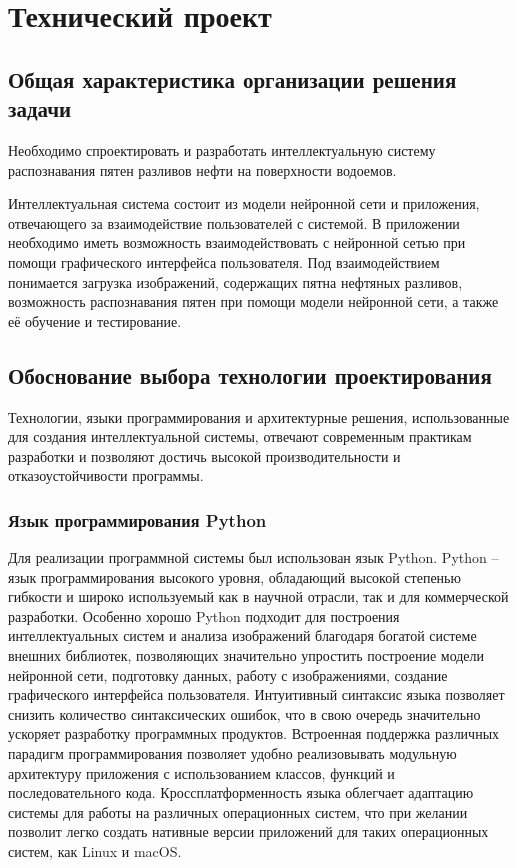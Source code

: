 \section{Технический проект}
\subsection{Общая характеристика организации решения задачи}

Необходимо спроектировать и разработать интеллектуальную систему распознавания пятен разливов нефти на поверхности водоемов.

Интеллектуальная система состоит из модели нейронной сети и приложения, отвечающего за взаимодействие пользователей с системой. В приложении необходимо иметь возможность взаимодействовать с нейронной сетью при помощи графического интерфейса пользователя. Под взаимодействием понимается загрузка изображений, содержащих пятна нефтяных разливов, возможность распознавания пятен при помощи модели нейронной сети, а также её обучение и тестирование.

\subsection{Обоснование выбора технологии проектирования}

Технологии, языки программирования и архитектурные решения, использованные для создания интеллектуальной системы, отвечают современным практикам разработки и позволяют достичь высокой производительности и отказоустойчивости программы.

\subsubsection{Язык программирования Python}

Для реализации программной системы был использован язык Python. Python -- язык программирования высокого уровня, обладающий высокой степенью гибкости и широко используемый как в научной отрасли, так и для коммерческой разработки. Особенно хорошо Python подходит для построения интеллектуальных систем и анализа изображений благодаря богатой системе внешних библиотек, позволяющих значительно упростить построение модели нейронной сети, подготовку данных, работу с изображениями, создание графического интерфейса пользователя. 
Интуитивный синтаксис языка позволяет снизить количество синтаксических ошибок, что в свою очередь значительно ускоряет разработку программных продуктов. Встроенная поддержка различных парадигм программирования позволяет удобно реализовывать модульную архитектуру приложения с использованием классов, функций и последовательного кода. Кроссплатформенность языка облегчает адаптацию системы для работы на различных операционных систем, что при желании позволит легко создать нативные версии приложений для таких операционных систем, как Linux и macOS.


